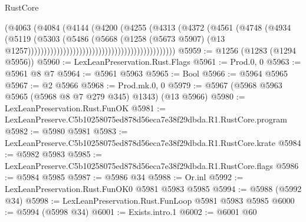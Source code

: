 \begin{lexlean}{RustCore}
\begin{coremodule}
                                                                (@4063
                                                                  (@4084
                                                                    (@4144
                                                                      (@4200
                                                                        (@4255
                                                                          (@4313
                                                                            (@4372
                                                                              (@4561
                                                                                (@4748
                                                                                  (@4934
                                                                                    (@5119
                                                                                      (@5303
                                                                                        (@5486
                                                                                          (@5668
                                                                                            (@1258
                                                                                              (@5673
                                                                                                @5907)
                                                                                              (@13
                                                                                                @1257))))))))))))))))))))))))))))))))))))))))))))))
@5959 := @1256 (@1283 (@1294 @5956))
@5960 := LexLeanPreservation.Rust.Flags
@5961 := Prod.{0, 0}
@5963 := @5961 @8 @7
@5964 := @5961 @5963
@5965 := Bool
@5966 := @5964 @5965
@5967 := @2 @5966
@5968 := Prod.mk.{0, 0}
@5979 := @5967 (@5968 @5963 @5965 (@5968 @8 @7 @279 @345) @1343) (@13 @5966)
@5980 := LexLeanPreservation.Rust.FunOK
@5981 := LexLeanPreserve.C5b10258075ed878d56eca7e38f29dbda.R1.RustCore.program
@5982 := @5980 @5981
@5983 := LexLeanPreserve.C5b10258075ed878d56eca7e38f29dbda.R1.RustCore.krate
@5984 := @5982 @5983
@5985 := LexLeanPreserve.C5b10258075ed878d56eca7e38f29dbda.R1.RustCore.flags
@5986 := @5984 @5985
@5987 := @5986 @34
@5988 := Or.inl
@5992 := LexLeanPreservation.Rust.FunOK0 @5981 @5983 @5985
@5994 := @5988 (@5992 @34)
@5998 := LexLeanPreservation.Rust.FunLoop @5981 @5983 @5985
@6000 := @5994 (@5998 @34)
@6001 := Exists.intro.{1}
@6002 := @6001 @60

\end{coremodule}
\end{lexlean}
